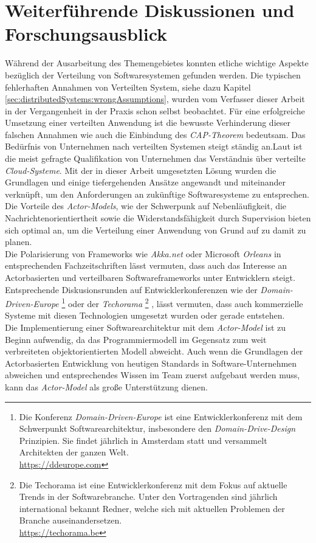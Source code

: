 \section{Weiterführende Diskussionen und Forschungsausblick}
Während der Ausarbeitung des Themengebietes konnten etliche wichtige Aspekte bezüglich der Verteilung von Softwaresystemen gefunden werden. Die typischen fehlerhaften Annahmen von Verteilten System, siehe dazu Kapitel \ref{sec:distributedSystems:wrongAssumptions}, wurden vom Verfasser dieser Arbeit in der Vergangenheit in der Praxis schon selbst beobachtet. Für eine erfolgreiche Umsetzung einer verteilten Anwendung ist die bewusste 
Verhinderung dieser falschen Annahmen wie auch die Einbindung des \textit{CAP-Theorem} bedeutsam. 
Das Bedürfnis von Unternehmen nach verteilten Systemen steigt ständig an.Laut \cite{theSkillsCompaniesNeedMost} ist die meist gefragte Qualifikation von Unternehmen das Verständnis über verteilte \textit{Cloud-Systeme}. Mit der in dieser Arbeit umgesetzten Lösung wurden die Grundlagen und einige tiefergehenden Ansätze angewandt und miteinander verknüpft, um den Anforderungen an zukünftige Softwaresysteme zu entsprechen. Die Vorteile des \textit{Actor-Models}, wie der Schwerpunk auf Nebenläufigkeit, die Nachrichtenorientiertheit sowie die Widerstandsfähigkeit durch Supervision bieten sich optimal an, um die Verteilung einer Anwendung von Grund auf zu damit zu planen. \\
Die Polarisierung von Frameworks wie \textit{Akka.net} oder Microsoft \textit{Orleans} in entsprechenden Fachzeitschriften lässt vermuten, dass auch das Interesse an Actorbasierten und verteilbaren Softwareframeworks unter Entwicklern steigt. Entsprechende Diskusionsrunden auf Entwicklerkonferenzen wie der \textit{Domain-Driven-Europe}
\footnote{Die Konferenz \textit{Domain-Driven-Europe} ist eine Entwicklerkonferenz mit dem Schwerpunkt Softwarearchitektur, insbesondere den \textit{Domain-Drive-Design} Prinzipien. Sie findet jährlich in Amsterdam statt und versammelt Architekten der ganzen Welt. \\ \url{https://ddeurope.com} }
oder der \textit{Techorama}
\footnote{Die Techorama ist eine Entwicklerkonferenz mit dem Fokus auf aktuelle Trends in der Softwarebranche. Unter den Vortragenden sind jährlich international bekannt Redner, welche sich mit aktuellen Problemen der Branche auseinandersetzen. \\ \url{https://techorama.be} }
, lässt vermuten, dass auch kommerzielle Systeme mit diesen Technologien umgesetzt wurden oder gerade entstehen. \\
Die Implementierung einer Softwarearchitektur mit dem \textit{Actor-Model} ist zu Beginn aufwendig, da das Programmiermodell im Gegensatz zum weit verbreiteten objektorientierten Modell abweicht. 
Auch wenn die Grundlagen der Actorbasierten Entwicklung von heutigen Standards in Software-Unternehmen abweichen und entsprechendes Wissen im Team zuerst aufgebaut werden muss, kann das \textit{Actor-Model} als große Unterstützung dienen.  
